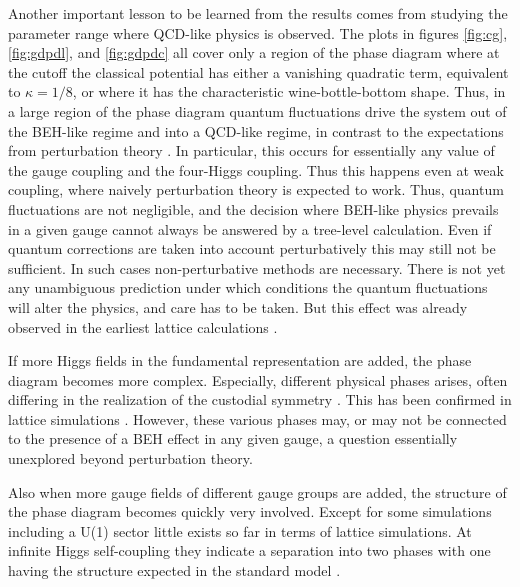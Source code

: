 \documentclass[final,12pt]{article}
\newcommand*{\1}{1\!\!\!\bot}
\begin{document}
Another important lesson to be learned from the results comes from studying the parameter range where QCD-like physics is observed. The plots in figures \ref{fig:cg}, \ref{fig:gdpdl}, and \ref{fig:gdpdc} all cover only a region of the phase diagram where at the cutoff the classical potential has either a vanishing quadratic term, equivalent to $\kappa=1/8$, or where it has the characteristic wine-bottle-bottom shape. Thus, in a large region of the phase diagram quantum fluctuations drive the system out of the BEH-like regime and into a QCD-like regime, in contrast to the expectations from perturbation theory \cite{Bohm:2001yx,Kapusta:2006pm}. In particular, this occurs for essentially any value of the gauge coupling and the four-Higgs coupling. Thus this happens even at weak coupling, where naively perturbation theory is expected to work. Thus, quantum fluctuations are not negligible, and the decision where BEH-like physics prevails in a given gauge cannot always be answered by a tree-level calculation. Even if quantum corrections are taken into account perturbatively \cite{Coleman:1973jx,Kapusta:2006pm} this may still not be sufficient. In such cases non-perturbative methods are necessary. There is not yet any unambiguous prediction under which conditions the quantum fluctuations will alter the physics, and care has to be taken. But this effect was already observed in the earliest lattice calculations \cite{Evertz:1985fc,Langguth:1985eu,Langguth:1985dr}.

If more Higgs fields in the fundamental representation are added, the phase diagram becomes more complex. Especially, different physical phases arises, often differing in the realization of the custodial symmetry \cite{Branco:2011iw,Ivanov:2017dad}. This has been confirmed in lattice simulations \cite{Lewis:2010ps,Wurtz:2009gf}. However, these various phases may, or may not be connected to the presence of a BEH effect in any given gauge, a question essentially unexplored beyond perturbation theory.

Also when more gauge fields of different gauge groups are added, the structure of the phase diagram becomes quickly very involved. Except for some simulations including a U(1) sector \cite{Shrock:1985un,Zubkov:2010np,Zubkov:2011sk,Zubkov:2011ia} little exists so far in terms of lattice simulations. At infinite Higgs self-coupling they indicate a separation into two phases with one having the structure expected in the standard model \cite{Shrock:1985ur}.
\end{document}
